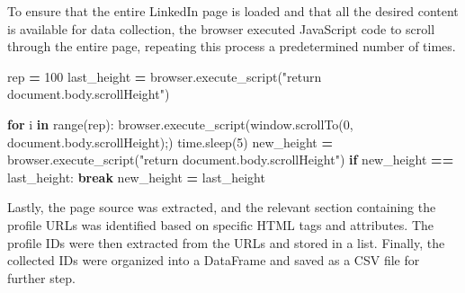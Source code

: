 \documentclass[11pt,]{article}
\newenvironment{Shaded}{\begin{snugshade}}{\end{snugshade}}
\newcommand{\BuiltInTok}[1]{#1}
\newcommand{\ControlFlowTok}[1]{\textcolor[rgb]{0.13,0.29,0.53}{\textbf{#1}}}
\newcommand{\DecValTok}[1]{\textcolor[rgb]{0.00,0.00,0.81}{#1}}
\newcommand{\KeywordTok}[1]{\textcolor[rgb]{0.13,0.29,0.53}{\textbf{#1}}}
\newcommand{\NormalTok}[1]{#1}
\newcommand{\OperatorTok}[1]{\textcolor[rgb]{0.81,0.36,0.00}{\textbf{#1}}}
\newcommand{\StringTok}[1]{\textcolor[rgb]{0.31,0.60,0.02}{#1}}
\begin{document}
To ensure that the entire LinkedIn page is loaded and that all the
desired content is available for data collection, the browser executed
JavaScript code to scroll through the entire page, repeating this
process a predetermined number of times.

\begin{Shaded}
\begin{Highlighting}[]
\NormalTok{rep }\OperatorTok{=} \DecValTok{100}
\NormalTok{last\_height }\OperatorTok{=}\NormalTok{ browser.execute\_script(}\StringTok{"return document.body.scrollHeight"}\NormalTok{)}

\ControlFlowTok{for}\NormalTok{ i }\KeywordTok{in} \BuiltInTok{range}\NormalTok{(rep):}
\NormalTok{    browser.execute\_script(}\StringTok{\textquotesingle{}window.scrollTo(0, document.body.scrollHeight);\textquotesingle{}}\NormalTok{)}
\NormalTok{    time.sleep(}\DecValTok{5}\NormalTok{)}
\NormalTok{    new\_height }\OperatorTok{=}\NormalTok{ browser.execute\_script(}\StringTok{"return document.body.scrollHeight"}\NormalTok{)}
    \ControlFlowTok{if}\NormalTok{ new\_height }\OperatorTok{==}\NormalTok{ last\_height:}
        \ControlFlowTok{break}
\NormalTok{    new\_height }\OperatorTok{=}\NormalTok{ last\_height}
\end{Highlighting}
\end{Shaded}

Lastly, the page source was extracted, and the relevant section
containing the profile URLs was identified based on specific HTML tags
and attributes. The profile IDs were then extracted from the URLs and
stored in a list. Finally, the collected IDs were organized into a
DataFrame and saved as a CSV file for further step.
\end{document}
